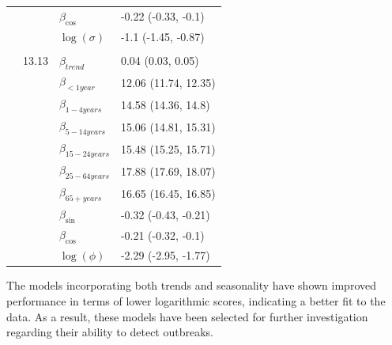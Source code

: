 \documentclass[a4paper,twoside,11pt]{report} %
\theoremstyle{definition}
\theoremstyle{definition}
\theoremstyle{definition}
\theoremstyle{definition}
\theoremstyle{remark}
\begin{document}
\begin{longtable}[t]{lrll}
\hspace{1em} &  & $\beta_{\cos}$ & -0.22 (-0.33, -0.1)\\

\hspace{1em} &  & $\log(\sigma)$ & -1.1 (-1.45, -0.87)\\
\cmidrule{1-4}
\addlinespace[0.3em]
\multicolumn{4}{l}{\textit{\textbf{Poisson Gamma}}}\\
\hspace{1em} & 13.13 & $\beta_{trend}$ & 0.04 (0.03, 0.05)\\

\hspace{1em} &  & $\beta_{<1 year}$ & 12.06 (11.74, 12.35)\\

\hspace{1em} &  & $\beta_{1-4 years}$ & 14.58 (14.36, 14.8)\\

\hspace{1em} &  & $\beta_{5-14 years}$ & 15.06 (14.81, 15.31)\\

\hspace{1em} &  & $\beta_{15-24 years}$ & 15.48 (15.25, 15.71)\\

\hspace{1em} &  & $\beta_{25-64 years}$ & 17.88 (17.69, 18.07)\\

\hspace{1em} &  & $\beta_{65+ years}$ & 16.65 (16.45, 16.85)\\

\hspace{1em} &  & $\beta_{\sin}$ & -0.32 (-0.43, -0.21)\\

\hspace{1em} &  & $\beta_{\cos}$ & -0.21 (-0.32, -0.1)\\

\hspace{1em} &  & $\log(\phi)$ & -2.29 (-2.95, -1.77)\\*
\end{longtable}

The models incorporating both trends and seasonality have shown improved performance in terms of lower logarithmic scores, indicating a better fit to the data. As a result, these models have been selected for further investigation regarding their ability to detect outbreaks.
\end{document}
